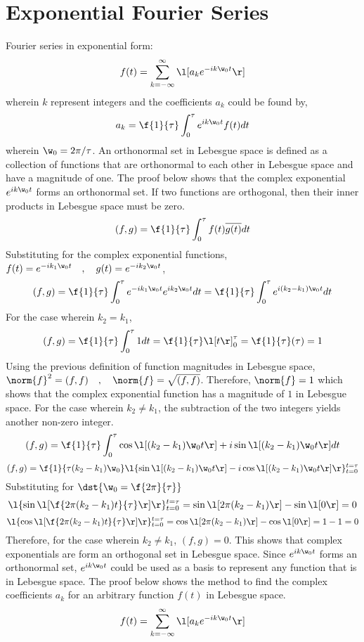 \section{Exponential Fourier Series}
\begin{comment}
\end{comment}
Fourier series in exponential form:
$$f(t) = \sum^{\infty}_{k = -\infty}\l[a_ke^{-ik\w_0t}\r]$$
wherein $k$ represent integers and the coefficients $a_k$ could be found by,
$$a_k = \f{1}{\tau}\int^{\tau}_{0}e^{ik\w_0t}f(t)dt$$
wherein $\w_0 = 2\pi/\tau$. An orthonormal set in Lebesgue space is defined as a collection of functions that are orthonormal to each other in Lebesgue space and have a magnitude of one. The proof below shows that the complex exponential $e^{ik\w_0t}$ forms an orthonormal set. If two functions are orthogonal, then their inner products in Lebesgue space must be zero.
$$(f,g) = \f{1}{\tau}\int^{\tau}_{0}f(t)\overline{g(t)}dt$$
Substituting for the complex exponential functions, $f(t) = e^{-ik_1\w_0t}\quad,\quad g(t) = e^{-ik_2\w_0t}$,
$$(f,g) = \f{1}{\tau}\int^{\tau}_{0}e^{-ik_1\w_0t} e^{ik_2\w_0t}dt = \f{1}{\tau}\int^{\tau}_{0}e^{i(k_2-k_1)\w_0t}dt$$
For the case wherein $k_2 = k_1$, 
$$(f,g) = \f{1}{\tau}\int^{\tau}_{0}1dt = \f{1}{\tau} \l[t\r]^{\tau}_{0} = \f{1}{\tau}(\tau) = 1$$
Using the previous definition of function magnitudes in Lebesgue space, $\norm{f}^2 = (f,f)\quad,\quad\norm{f} = \sqrt{(f,f)}$. Therefore, $\norm{f} = 1$ which shows that the complex exponential function has a magnitude of $1$ in Lebesgue space. For the case wherein $k_2 \neq k_1$, the subtraction of the two integers yields another non-zero integer.
$$(f,g) = \f{1}{\tau}\int^{\tau}_{0} \cos\l[(k_2-k_1)\w_0t\r] + i\sin\l[(k_2-k_1)\w_0t\r]dt$$
$$(f,g) = \f{1}{\tau(k_2-k_1)\w_0}\l\{\sin\l[(k_2-k_1)\w_0t\r] - i\cos\l[(k_2-k_1)\w_0t\r]\r\}^{t = \tau}_{t = 0}$$
Substituting for $\dst{\w_0 = \f{2\pi}{\tau}}$ 
$$\l\{\sin\l[\f{2\pi(k_2-k_1)t}{\tau}\r]\r\}^{t = \tau}_{t = 0} = \sin\l[2\pi(k_2-k_1)\r] - \sin\l[0\r] = 0$$
$$\l\{\cos\l[\f{2\pi(k_2-k_1)t}{\tau}\r]\r\}^{t = \tau}_{t = 0} = \cos\l[2\pi(k_2-k_1)\r] - \cos\l[0\r] = 1 - 1 = 0$$
Therefore, for the case wherein $k_2 \neq k_1$, $(f,g) = 0$. This shows that complex exponentials are form an orthogonal set in Lebesgue space. Since $e^{ik\w_0t}$ forms an orthonormal set, $e^{ik\w_0t}$ could be used as a basis to represent any function that is in Lebesgue space. The proof below shows the method to find the complex coefficients $a_k$ for an arbitrary function $f(t)$ in Lebesgue space.
$$f(t) = \sum^{\infty}_{k = -\infty}\l[a_ke^{-ik\w_0t}\r]$$
